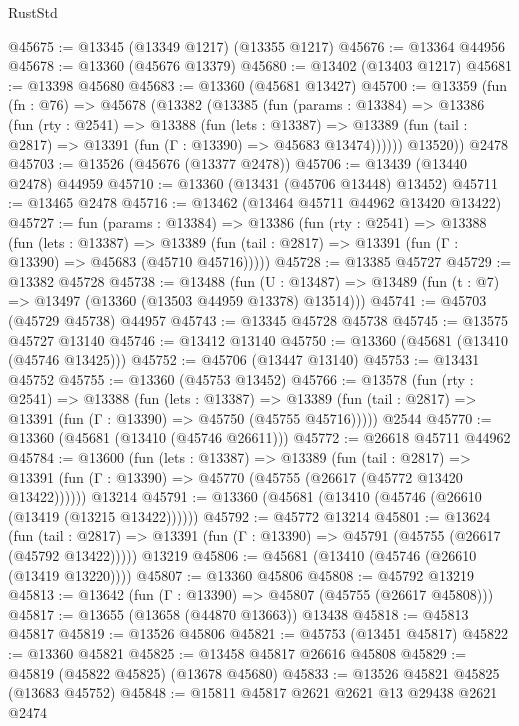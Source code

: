 \begin{lexlean}{RustStd}
\begin{coremodule}
@45675 := @13345 (@13349 @1217) (@13355 @1217)
@45676 := @13364 @44956
@45678 := @13360 (@45676 @13379)
@45680 := @13402 (@13403 @1217)
@45681 := @13398 @45680
@45683 := @13360 (@45681 @13427)
@45700 := @13359
    (fun (fn : @76) =>
    @45678
      (@13382
        (@13385
          (fun (params : @13384) =>
          @13386
            (fun (rty : @2541) =>
            @13388
              (fun (lets : @13387) =>
              @13389 (fun (tail : @2817) => @13391 (fun (Γ : @13390) => @45683 @13474))))))
        @13520))
    @2478
@45703 := @13526 (@45676 (@13377 @2478))
@45706 := @13439 (@13440 @2478) @44959
@45710 := @13360 (@13431 (@45706 @13448) @13452)
@45711 := @13465 @2478
@45716 := @13462 (@13464 @45711 @44962 @13420 @13422)
@45727 := fun (params : @13384) =>
  @13386
    (fun (rty : @2541) =>
    @13388
      (fun (lets : @13387) =>
      @13389 (fun (tail : @2817) => @13391 (fun (Γ : @13390) => @45683 (@45710 @45716)))))
@45728 := @13385 @45727
@45729 := @13382 @45728
@45738 := @13488
    (fun (U : @13487) => @13489 (fun (t : @7) => @13497 (@13360 (@13503 @44959 @13378) @13514)))
@45741 := @45703 (@45729 @45738) @44957
@45743 := @13345 @45728 @45738
@45745 := @13575 @45727 @13140
@45746 := @13412 @13140
@45750 := @13360 (@45681 (@13410 (@45746 @13425)))
@45752 := @45706 (@13447 @13140)
@45753 := @13431 @45752
@45755 := @13360 (@45753 @13452)
@45766 := @13578
    (fun (rty : @2541) =>
    @13388
      (fun (lets : @13387) =>
      @13389 (fun (tail : @2817) => @13391 (fun (Γ : @13390) => @45750 (@45755 @45716)))))
    @2544
@45770 := @13360 (@45681 (@13410 (@45746 @26611)))
@45772 := @26618 @45711 @44962
@45784 := @13600
    (fun (lets : @13387) =>
    @13389
      (fun (tail : @2817) =>
      @13391 (fun (Γ : @13390) => @45770 (@45755 (@26617 (@45772 @13420 @13422))))))
    @13214
@45791 := @13360 (@45681 (@13410 (@45746 (@26610 (@13419 (@13215 @13422))))))
@45792 := @45772 @13214
@45801 := @13624
    (fun (tail : @2817) => @13391 (fun (Γ : @13390) => @45791 (@45755 (@26617 (@45792 @13422)))))
    @13219
@45806 := @45681 (@13410 (@45746 (@26610 (@13419 @13220))))
@45807 := @13360 @45806
@45808 := @45792 @13219
@45813 := @13642 (fun (Γ : @13390) => @45807 (@45755 (@26617 @45808)))
@45817 := @13655 (@13658 (@44870 @13663)) @13438
@45818 := @45813 @45817
@45819 := @13526 @45806
@45821 := @45753 (@13451 @45817)
@45822 := @13360 @45821
@45825 := @13458 @45817 @26616 @45808
@45829 := @45819 (@45822 @45825) (@13678 @45680)
@45833 := @13526 @45821 @45825 (@13683 @45752)
@45848 := @15811
    @45817
    @2621
    @2621
    @13
    @29438
    @2621
    @2474

\end{coremodule}
\end{lexlean}
